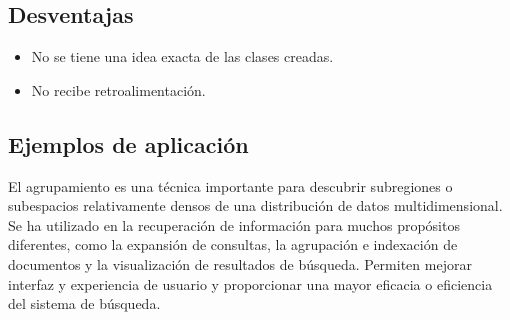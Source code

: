 \documentclass{llncs}
\begin{document}
\subsection{Desventajas} 
	\begin{itemize}
		\item No se tiene una idea exacta de las clases creadas.
		\item No recibe retroalimentaci\'on.
	\end{itemize}

\subsection{Ejemplos de aplicaci\'on} 
El agrupamiento es una técnica importante para descubrir subregiones o subespacios relativamente densos de una distribución de datos multidimensional. Se ha utilizado en la recuperación de información para muchos propósitos diferentes, como la expansión de consultas, la agrupación e indexación de documentos y la visualización de resultados de búsqueda. Permiten mejorar interfaz y experiencia de usuario y proporcionar una mayor eficacia o eficiencia del sistema de búsqueda. 
\end{document}

